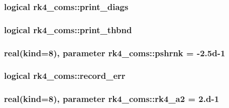 \subsubsection[{\texorpdfstring{print\+\_\+diags}{print_diags}}]{\setlength{\rightskip}{0pt plus 5cm}logical rk4\+\_\+coms\+::print\+\_\+diags}\hypertarget{namespacerk4__coms_a45d06376c0007b5db575b229cc2d11b1}{}\label{namespacerk4__coms_a45d06376c0007b5db575b229cc2d11b1}
\subsubsection[{\texorpdfstring{print\+\_\+thbnd}{print_thbnd}}]{\setlength{\rightskip}{0pt plus 5cm}logical rk4\+\_\+coms\+::print\+\_\+thbnd}\hypertarget{namespacerk4__coms_ad87029f758f9a6906b3aea2205873427}{}\label{namespacerk4__coms_ad87029f758f9a6906b3aea2205873427}
\subsubsection[{\texorpdfstring{pshrnk}{pshrnk}}]{\setlength{\rightskip}{0pt plus 5cm}real(kind=8), parameter rk4\+\_\+coms\+::pshrnk = -\/2.\+5d-\/1}\hypertarget{namespacerk4__coms_a83a7b5210aa05ed67147b0b6e4250f46}{}\label{namespacerk4__coms_a83a7b5210aa05ed67147b0b6e4250f46}
\subsubsection[{\texorpdfstring{record\+\_\+err}{record_err}}]{\setlength{\rightskip}{0pt plus 5cm}logical rk4\+\_\+coms\+::record\+\_\+err}\hypertarget{namespacerk4__coms_a8758ba5171a32f83e20dd93601fa21d6}{}\label{namespacerk4__coms_a8758ba5171a32f83e20dd93601fa21d6}
\subsubsection[{\texorpdfstring{rk4\+\_\+a2}{rk4_a2}}]{\setlength{\rightskip}{0pt plus 5cm}real(kind=8), parameter rk4\+\_\+coms\+::rk4\+\_\+a2 = 2.d-\/1}\hypertarget{namespacerk4__coms_aaccaa3d4ec955eecd38ce2c8c8813cf9}{}\label{namespacerk4__coms_aaccaa3d4ec955eecd38ce2c8c8813cf9}
